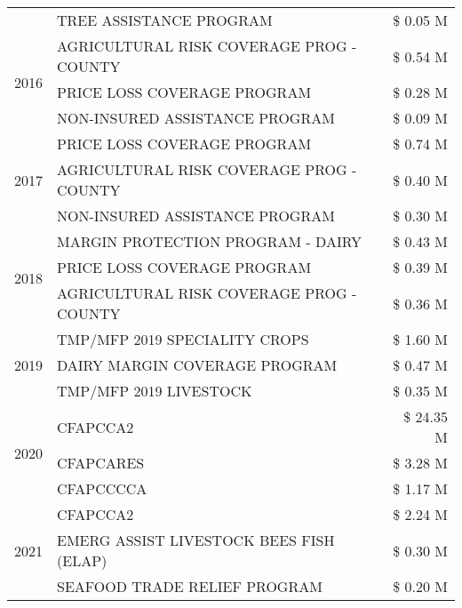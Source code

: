 \begin{tabular}{llr}
 & TREE ASSISTANCE PROGRAM & \$ 0.05 M \\
\cline{1-3}
\multirow[t]{3}{*}{2016} & AGRICULTURAL RISK COVERAGE PROG - COUNTY & \$ 0.54 M \\
 & PRICE LOSS COVERAGE PROGRAM & \$ 0.28 M \\
 & NON-INSURED ASSISTANCE PROGRAM & \$ 0.09 M \\
\cline{1-3}
\multirow[t]{3}{*}{2017} & PRICE LOSS COVERAGE PROGRAM & \$ 0.74 M \\
 & AGRICULTURAL RISK COVERAGE PROG - COUNTY & \$ 0.40 M \\
 & NON-INSURED ASSISTANCE PROGRAM & \$ 0.30 M \\
\cline{1-3}
\multirow[t]{3}{*}{2018} & MARGIN PROTECTION PROGRAM - DAIRY & \$ 0.43 M \\
 & PRICE LOSS COVERAGE PROGRAM & \$ 0.39 M \\
 & AGRICULTURAL RISK COVERAGE PROG - COUNTY & \$ 0.36 M \\
\cline{1-3}
\multirow[t]{3}{*}{2019} & TMP/MFP 2019 SPECIALITY CROPS & \$ 1.60 M \\
 & DAIRY MARGIN COVERAGE PROGRAM & \$ 0.47 M \\
 & TMP/MFP 2019 LIVESTOCK & \$ 0.35 M \\
\cline{1-3}
\multirow[t]{3}{*}{2020} & CFAPCCA2 & \$ 24.35 M \\
 & CFAPCARES & \$ 3.28 M \\
 & CFAPCCCCA & \$ 1.17 M \\
\cline{1-3}
\multirow[t]{3}{*}{2021} & CFAPCCA2 & \$ 2.24 M \\
 & EMERG ASSIST LIVESTOCK BEES FISH (ELAP) & \$ 0.30 M \\
 & SEAFOOD TRADE RELIEF PROGRAM & \$ 0.20 M \\
\cline{1-3}
\bottomrule
\end{tabular}
